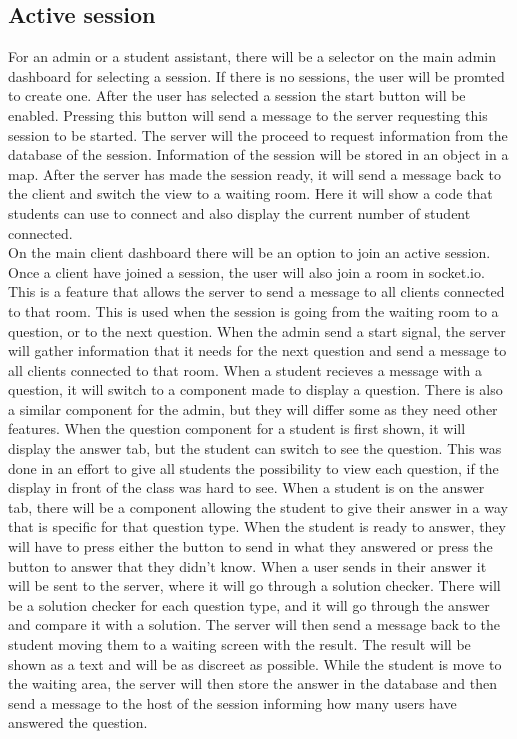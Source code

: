 \subsection{Active session}
For an admin or a student assistant, there will be a selector on the main admin dashboard for selecting a session. If there is no sessions, the user will be promted to create one. After the user has selected a session the start button will be enabled. Pressing this button will send a message to the server requesting this session to be started. The server will the proceed to request information from the database of the session. Information of the session will be stored in an object in a map. After the server has made the session ready, it will send a message back to the client and switch the view to a waiting room. Here it will show a code that students can use to connect and also display the current number of student connected. 
\\[11pt]
On the main client dashboard there will be an option to join an active session. Once a client have joined a session, the user will also join a room in socket.io. This is a feature that allows the server to send a message to all clients connected to that room. This is used when the session is going from the waiting room to a question, or to the next question. When the admin send a start signal, the server will gather information that it needs for the next question and send a message to all clients connected to that room. When a student recieves a message with a question, it will switch to a component made to display a question. There is also a similar component for the admin, but they will differ some as they need other features. When the question component for a student is first shown, it will display the answer tab, but the student can switch to see the question. This was done in an effort to give all students the possibility to view each question, if the display in front of the class was hard to see. When a student is on the answer tab, there will be a component allowing the student to give their answer in a way that is specific for that question type. When the student is ready to answer, they will have to press either the button to send in what they answered or press the button to answer that they didn't know. When a user sends in their answer it will be sent to the server, where it will go through a solution checker. There will be a solution checker for each question type, and it will go through the answer and compare it with a solution. The server will then send a message back to the student moving them to a waiting screen with the result. The result will be shown as a text and will be as discreet as possible. While the student is move to the waiting area, the server will then store the answer in the database and then send a message to the host of the session informing how many users have answered the question.
